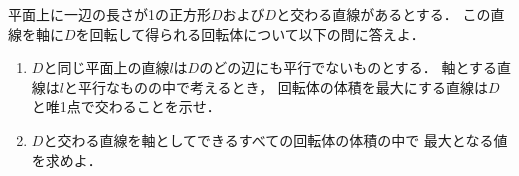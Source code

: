 \documentclass[../../main.tex]{subfiles}
\begin{document}
平面上に一辺の長さが1の正方形$D$および$D$と交わる直線があるとする．
この直線を軸に$D$を回転して得られる回転体について以下の問に答えよ．
\begin{enumerate}
  \item $D$と同じ平面上の直線$l$は$D$のどの辺にも平行でないものとする．
    軸とする直線は$l$と平行なものの中で考えるとき，
    回転体の体積を最大にする直線は$D$と唯1点で交わることを示せ．
  \item $D$と交わる直線を軸としてできるすべての回転体の体積の中で
    最大となる値を求めよ．
\end{enumerate}
\end{document}
